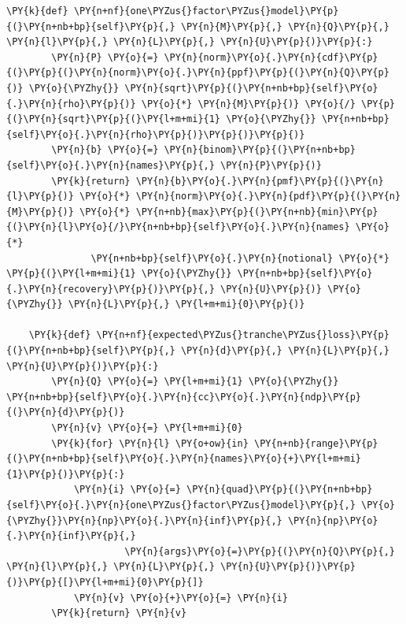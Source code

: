 \begin{tcolorbox}[breakable, size=fbox, boxrule=1pt, pad at break*=1mm,colback=cellbackground, colframe=cellborder]
\begin{Verbatim}[commandchars=\\\{\}]
    \PY{k}{def} \PY{n+nf}{one\PYZus{}factor\PYZus{}model}\PY{p}{(}\PY{n+nb+bp}{self}\PY{p}{,} \PY{n}{M}\PY{p}{,} \PY{n}{Q}\PY{p}{,} \PY{n}{l}\PY{p}{,} \PY{n}{L}\PY{p}{,} \PY{n}{U}\PY{p}{)}\PY{p}{:}
        \PY{n}{P} \PY{o}{=} \PY{n}{norm}\PY{o}{.}\PY{n}{cdf}\PY{p}{(}\PY{p}{(}\PY{n}{norm}\PY{o}{.}\PY{n}{ppf}\PY{p}{(}\PY{n}{Q}\PY{p}{)} \PY{o}{\PYZhy{}} \PY{n}{sqrt}\PY{p}{(}\PY{n+nb+bp}{self}\PY{o}{.}\PY{n}{rho}\PY{p}{)} \PY{o}{*} \PY{n}{M}\PY{p}{)} \PY{o}{/} \PY{p}{(}\PY{n}{sqrt}\PY{p}{(}\PY{l+m+mi}{1} \PY{o}{\PYZhy{}} \PY{n+nb+bp}{self}\PY{o}{.}\PY{n}{rho}\PY{p}{)}\PY{p}{)}\PY{p}{)}
        \PY{n}{b} \PY{o}{=} \PY{n}{binom}\PY{p}{(}\PY{n+nb+bp}{self}\PY{o}{.}\PY{n}{names}\PY{p}{,} \PY{n}{P}\PY{p}{)}
        \PY{k}{return} \PY{n}{b}\PY{o}{.}\PY{n}{pmf}\PY{p}{(}\PY{n}{l}\PY{p}{)} \PY{o}{*} \PY{n}{norm}\PY{o}{.}\PY{n}{pdf}\PY{p}{(}\PY{n}{M}\PY{p}{)} \PY{o}{*} \PY{n+nb}{max}\PY{p}{(}\PY{n+nb}{min}\PY{p}{(}\PY{n}{l}\PY{o}{/}\PY{n+nb+bp}{self}\PY{o}{.}\PY{n}{names} \PY{o}{*} 
               \PY{n+nb+bp}{self}\PY{o}{.}\PY{n}{notional} \PY{o}{*} \PY{p}{(}\PY{l+m+mi}{1} \PY{o}{\PYZhy{}} \PY{n+nb+bp}{self}\PY{o}{.}\PY{n}{recovery}\PY{p}{)}\PY{p}{,} \PY{n}{U}\PY{p}{)} \PY{o}{\PYZhy{}} \PY{n}{L}\PY{p}{,} \PY{l+m+mi}{0}\PY{p}{)}
	
    \PY{k}{def} \PY{n+nf}{expected\PYZus{}tranche\PYZus{}loss}\PY{p}{(}\PY{n+nb+bp}{self}\PY{p}{,} \PY{n}{d}\PY{p}{,} \PY{n}{L}\PY{p}{,} \PY{n}{U}\PY{p}{)}\PY{p}{:}
        \PY{n}{Q} \PY{o}{=} \PY{l+m+mi}{1} \PY{o}{\PYZhy{}} \PY{n+nb+bp}{self}\PY{o}{.}\PY{n}{cc}\PY{o}{.}\PY{n}{ndp}\PY{p}{(}\PY{n}{d}\PY{p}{)}
        \PY{n}{v} \PY{o}{=} \PY{l+m+mi}{0}
        \PY{k}{for} \PY{n}{l} \PY{o+ow}{in} \PY{n+nb}{range}\PY{p}{(}\PY{n+nb+bp}{self}\PY{o}{.}\PY{n}{names}\PY{o}{+}\PY{l+m+mi}{1}\PY{p}{)}\PY{p}{:}
            \PY{n}{i} \PY{o}{=} \PY{n}{quad}\PY{p}{(}\PY{n+nb+bp}{self}\PY{o}{.}\PY{n}{one\PYZus{}factor\PYZus{}model}\PY{p}{,} \PY{o}{\PYZhy{}}\PY{n}{np}\PY{o}{.}\PY{n}{inf}\PY{p}{,} \PY{n}{np}\PY{o}{.}\PY{n}{inf}\PY{p}{,} 
                     \PY{n}{args}\PY{o}{=}\PY{p}{(}\PY{n}{Q}\PY{p}{,} \PY{n}{l}\PY{p}{,} \PY{n}{L}\PY{p}{,} \PY{n}{U}\PY{p}{)}\PY{p}{)}\PY{p}{[}\PY{l+m+mi}{0}\PY{p}{]}
            \PY{n}{v} \PY{o}{+}\PY{o}{=} \PY{n}{i}
        \PY{k}{return} \PY{n}{v}
	

\end{Verbatim}
\end{tcolorbox}
